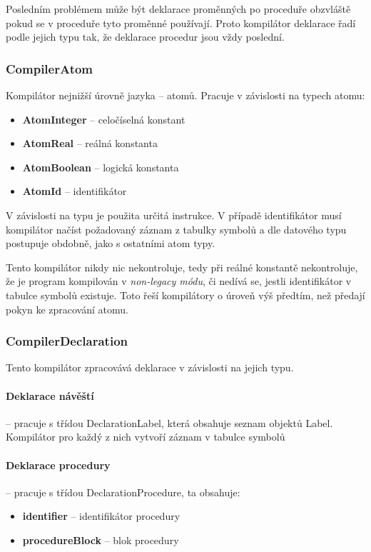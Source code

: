 \documentclass[
12pt,
a4paper,
pdftex,
czech,
titlepage
]{report}
\begin{document}
Posledním problémem může být deklarace proměnných po proceduře obzvláště pokud se v proceduře tyto proměnné používají. Proto kompilátor deklarace řadí podle jejich typu tak, že deklarace procedur jsou vždy poslední.

\subsubsection{CompilerAtom}
Kompilátor nejnižší úrovně jazyka -- atomů. Pracuje v závislosti na typech atomu:
\begin{itemize}
\item \textbf{AtomInteger} -- celočíselná konstant
\item \textbf{AtomReal} -- reálná konstanta
\item \textbf{AtomBoolean} -- logická konstanta
\item \textbf{AtomId} -- identifikátor
\end{itemize}

V závislosti na typu je použita určitá instrukce. V případě identifikátor musí kompilátor načíst požadovaný záznam z tabulky symbolů a dle datového typu postupuje obdobně, jako s ostatními atom typy.

Tento kompilátor nikdy nic nekontroluje, tedy při reálné konstantě nekontroluje, že je program kompilován v \textit{non-legacy módu}, či nedívá se, jestli identifikátor v tabulce symbolů existuje. Toto řeší kompilátory o úroveň výš předtím, než předají pokyn ke zpracování atomu.

\subsubsection{CompilerDeclaration}

Tento kompilátor zpracovává deklarace v závislosti na jejich typu.

\paragraph{Deklarace návěští} -- pracuje s třídou DeclarationLabel, která obsahuje seznam objektů Label. Kompilátor pro každý z nich vytvoří záznam v tabulce symbolů

\paragraph{Deklarace procedury} -- pracuje s třídou DeclarationProcedure, ta obsahuje:
\begin{itemize}
\item \textbf{identifier} -- identifikátor procedury
\item \textbf{procedureBlock} -- blok procedury
\end{itemize}
\end{document}
